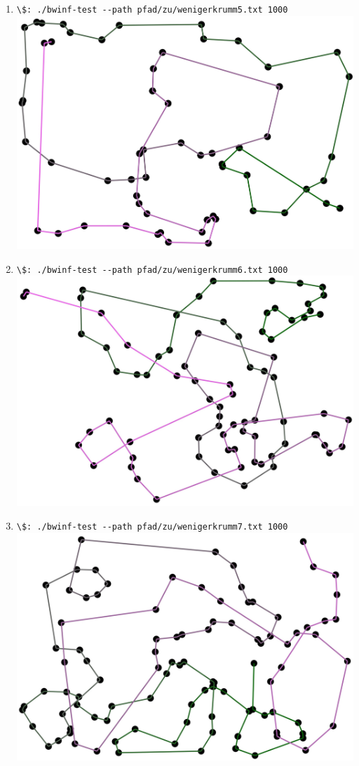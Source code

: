 \documentclass[a4paper,10pt,ngerman]{scrartcl}
\begin{document}
\begin{enumerate}
    \item
        \lstinline{\$: ./bwinf-test --path pfad/zu/wenigerkrumm5.txt 1000} \\
        \includegraphics[]{output__wenigerkrumm5__3506.4656.jpg}
    \newpage
    \item 
        \lstinline{\$: ./bwinf-test --path pfad/zu/wenigerkrumm6.txt 1000} \\
        \includegraphics[]{output__wenigerkrumm6__4049.9133.jpg}
    \item 
        \lstinline{\$: ./bwinf-test --path pfad/zu/wenigerkrumm7.txt 1000} \\
        \includegraphics[]{output__wenigerkrumm7__4748.518.jpg}

\end{enumerate}
\end{document}
